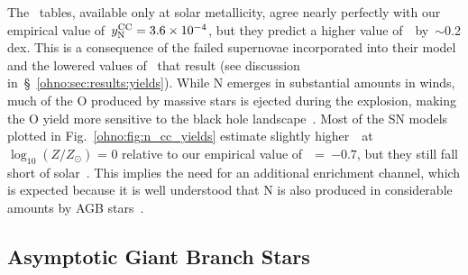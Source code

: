 The~\citet{Sukhbold2016} tables, available only at solar metallicity, agree
nearly perfectly with our empirical value of~$y_\text{N}^\text{CC} = 3.6\times10^{-4}$, but
they predict a higher value of~\no\subcc~by~$\sim$0.2 dex.
This is a consequence of the failed supernovae incorporated into their model
and the lowered values of~ that result (see discussion
in~\S~\ref{ohno:sec:results:yields}).
While N emerges in substantial amounts in winds, much of the O produced by
massive stars is ejected during the explosion, making the O yield more
sensitive to the black hole landscape~\citep{Griffith2021b}.
Most of the SN models plotted in Fig.~\ref{ohno:fig:n_cc_yields} estimate slightly
higher~\no\subcc~at~$\log_{10}(Z / Z_\odot)$ = 0 relative to our empirical
value of~\no\subcc~=~$-0.7$, but they still fall short of solar~\no.
This implies the need for an additional enrichment channel, which is expected
because it is well understood that N is also produced in considerable amounts
by AGB stars~\citep[e.g.][]{Johnson2019}.

\subsection{Asymptotic Giant Branch Stars}
\label{ohno:sec:yields:agb}

